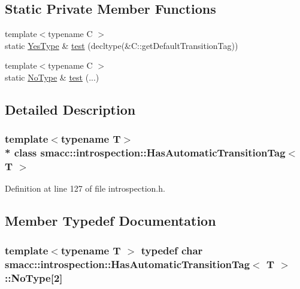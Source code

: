 \subsection*{Static Private Member Functions}
\begin{DoxyCompactItemize}
\item 
{\footnotesize template$<$typename C $>$ }\\static \hyperlink{classsmacc_1_1introspection_1_1HasAutomaticTransitionTag_a750a08a185de0fa20331ba7cfc531dde}{Yes\+Type} \& \hyperlink{classsmacc_1_1introspection_1_1HasAutomaticTransitionTag_a9de2266c38ff1f570674289f32b0faaf}{test} (decltype(\&C\+::get\+Default\+Transition\+Tag))
\item 
{\footnotesize template$<$typename C $>$ }\\static \hyperlink{classsmacc_1_1introspection_1_1HasAutomaticTransitionTag_ab81e7f76862ba064df3fd8e78b3864c4}{No\+Type} \& \hyperlink{classsmacc_1_1introspection_1_1HasAutomaticTransitionTag_aa38a947c16db7a23eefa754ba2c90782}{test} (...)
\end{DoxyCompactItemize}


\subsection{Detailed Description}
\subsubsection*{template$<$typename T$>$\\*
class smacc\+::introspection\+::\+Has\+Automatic\+Transition\+Tag$<$ T $>$}



Definition at line 127 of file introspection.\+h.



\subsection{Member Typedef Documentation}
\subsubsection[{\texorpdfstring{No\+Type}{NoType}}]{\setlength{\rightskip}{0pt plus 5cm}template$<$typename T $>$ typedef char {\bf smacc\+::introspection\+::\+Has\+Automatic\+Transition\+Tag}$<$ T $>$\+::No\+Type\mbox{[}2\mbox{]}\hspace{0.3cm}{\ttfamily [private]}}\hypertarget{classsmacc_1_1introspection_1_1HasAutomaticTransitionTag_ab81e7f76862ba064df3fd8e78b3864c4}{}\label{classsmacc_1_1introspection_1_1HasAutomaticTransitionTag_ab81e7f76862ba064df3fd8e78b3864c4}


